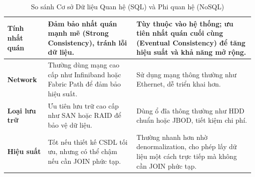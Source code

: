 \begin{table}[H]
\begin{tabularx}{\textwidth}{|l|X|X|}
\textbf{Tính nhất quán} & Đảm bảo nhất quán mạnh mẽ (Strong Consistency), tránh lỗi dữ liệu. & Tùy thuộc vào hệ thống; ưu tiên nhất quán cuối cùng (Eventual Consistency) để tăng hiệu suất và khả năng mở rộng. \\ \hline
\textbf{Network} & Thường dùng mạng cao cấp như Infiniband hoặc Fabric Path để đảm bảo hiệu suất. & Sử dụng mạng thông thường như Ethernet, dễ triển khai hơn. \\ \hline
\textbf{Loại lưu trữ} & Ưu tiên lưu trữ cao cấp như SAN hoặc RAID để bảo vệ dữ liệu. & Dùng ổ đĩa thông thường như HDD chuẩn hoặc JBOD, tiết kiệm chi phí. \\ \hline
\textbf{Hiệu suất} & Tốt nếu thiết kế CSDL tối ưu, nhưng có thể chậm nếu cần JOIN phức tạp. & Thường nhanh hơn nhờ denormalization, cho phép lấy dữ liệu một cách trực tiếp mà không cần JOIN phức tạp. \\ \hline
\end{tabularx}
\vspace{15pt}
\caption{So sánh Cơ sở Dữ liệu Quan hệ (SQL) và Phi quan hệ (NoSQL)}
\label{tab:sql_vs_nosql}
\end{table}
